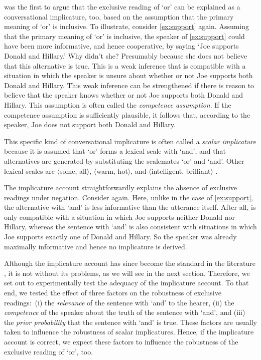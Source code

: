 \documentclass[12pt]{article}
\begin{document}
\citet{horn1972} was the first to argue that the exclusive reading of `or' can be explained as
a conversational implicature, too, based on the assumption that the primary meaning of `or' is
inclusive. To illustrate, consider \ref{ex:support} again. Assuming that the primary meaning of
`or' is inclusive, the speaker of \ref{ex:support} could have been more informative, and hence
cooperative, by saying `Joe supports Donald and Hillary.' Why didn't she? Presumably because
she does not believe that this alternative is true. This is a weak inference that is compatible
with a situation in which the speaker is unsure about whether or not Joe supports both Donald
and Hillary. This weak inference can be strengthened if there is reason to believe that the speaker knows whether or not Joe supports both Donald and Hillary. This assumption is often called the \emph{competence assumption}. If the competence assumption is sufficiently plausible, it follows that, according to the speaker, Joe does not support both Donald and Hillary.

This specific kind of conversational implicature is often called a \emph{scalar implicature} because it is assumed that `or' forms a lexical scale with `and', and that alternatives are generated by substituting the scalemates `or' and `and'. Other lexical scales are $\langle$some, all$\rangle$, $\langle$warm, hot$\rangle$, and $\langle$intelligent, brilliant$\rangle$ \citep[cf. e.g.,][]{tiel2016}.

The implicature account straightforwardly explains the absence of exclusive readings under negation. Consider \LLast again. Here, unlike in the case of \ref{ex:support}, the alternative with `and' is less informative than the utterance itself. After all, \LLast is only compatible with a situation in which Joe supports neither Donald nor Hillary, whereas the sentence with `and' is also consistent with situations in which Joe supports exactly one of Donald and Hillary. So the speaker was already maximally informative and hence no implicature is derived.

Although the implicature account has since become the standard in the literature \citep[e.g.,][]{chevallier2008, chierchia2012, fox2007, sauerland2004, geurts2010}, it is not without its problems, as we will see in the next section. Therefore, we set out to experimentally test the adequacy of the implicature account. To that end, we tested the effect of three factors on the robustness of exclusive readings:\ (i) the \emph{relevance} of the sentence with `and' to the hearer, (ii) the \emph{competence} of the speaker about the truth of the sentence with `and', and (iii) the \emph{prior probability} that the sentence with `and' is true. These factors are usually taken to influence the robustness of scalar implicatures. Hence, if the implicature account is correct, we expect these factors to influence the robustness of the exclusive reading of `or', too. 
\end{document}
